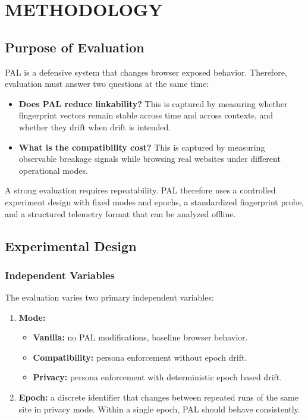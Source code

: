 \documentclass[11pt]{report}
\begin{document}
\chapter{METHODOLOGY}

\section{Purpose of Evaluation}

PAL is a defensive system that changes browser exposed behavior. Therefore, evaluation must answer two questions at the same time:

\begin{itemize}
    \item \textbf{Does PAL reduce linkability?} This is captured by measuring whether fingerprint vectors remain stable across time and across contexts, and whether they drift when drift is intended.
    \item \textbf{What is the compatibility cost?} This is captured by measuring observable breakage signals while browsing real websites under different operational modes.
\end{itemize}

A strong evaluation requires repeatability. PAL therefore uses a controlled experiment design with fixed modes and epochs, a standardized fingerprint probe, and a structured telemetry format that can be analyzed offline.

\section{Experimental Design}

\subsection{Independent Variables}

The evaluation varies two primary independent variables:

\begin{enumerate}
    \item \textbf{Mode:}
    \begin{itemize}
        \item \textbf{Vanilla:} no PAL modifications, baseline browser behavior.
        \item \textbf{Compatibility:} persona enforcement without epoch drift.
        \item \textbf{Privacy:} persona enforcement with deterministic epoch based drift.
    \end{itemize}

    \item \textbf{Epoch:} a discrete identifier that changes between repeated runs of the same site in privacy mode. Within a single epoch, PAL should behave consistently.
\end{enumerate}
\end{document}
